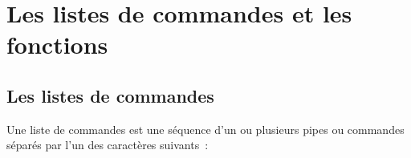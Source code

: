 %
%

\setcounter{remarque-cnt}{1}
\setcounter{example-cnt}{1}
\chapter{\label{listfcts}Les listes de commandes et les fonctions}

\section{Les listes de commandes}

Une liste de commandes est une s{\'e}quence d'un
ou plusieurs pipes  ou commandes s{\'e}par{\'e}s par l'un
des caract{\`e}res suivants~:

